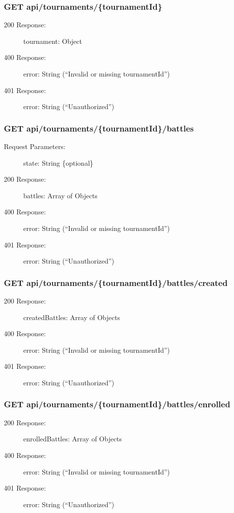 \documentclass{Configuration_Files/Template}
\begin{document}
\subsubsection{GET api/tournaments/\{tournamentId\}}
\begin{description}
    \item[200 Response:] tournament: Object
    \item[400 Response:] error: String (“Invalid or missing tournamentId”)
    \item[401 Response:] error: String (“Unauthorized”)
\end{description}

\subsubsection{GET api/tournaments/\{tournamentId\}/battles}
\begin{description}
    \item[Request Parameters:] state: String \{optional\}
    \item[200 Response:] battles: Array of Objects
    \item[400 Response:] error: String (“Invalid or missing tournamentId”)
    \item[401 Response:] error: String (“Unauthorized”)
\end{description}

\subsubsection{GET api/tournaments/\{tournamentId\}/battles/created}
\begin{description}
    \item[200 Response:] createdBattles: Array of Objects
    \item[400 Response:] error: String (“Invalid or missing tournamentId”)
    \item[401 Response:] error: String (“Unauthorized”)
\end{description}

\subsubsection{GET api/tournaments/\{tournamentId\}/battles/enrolled}
\begin{description}
    \item[200 Response:] enrolledBattles: Array of Objects
    \item[400 Response:] error: String (“Invalid or missing tournamentId”)
    \item[401 Response:] error: String (“Unauthorized”)
\end{description}
\end{document}
